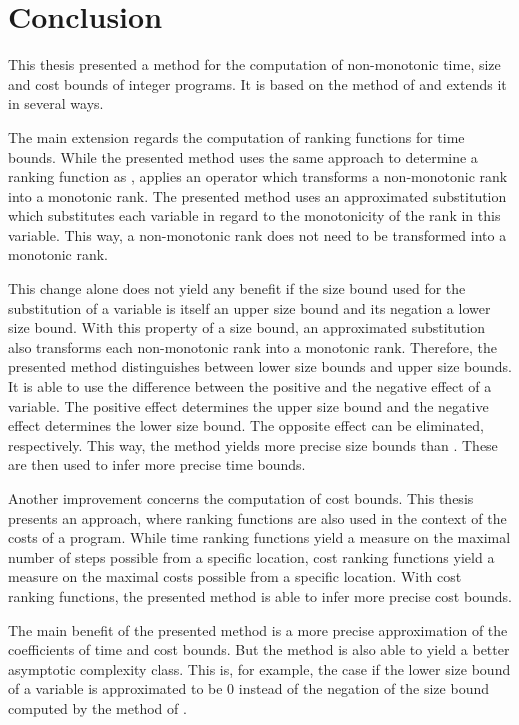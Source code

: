 \chapter{Conclusion}

This thesis presented a method for the computation of non-monotonic time, size and cost bounds of integer programs.
It is based on the method of \cite{koat} and extends it in several ways.

The main extension regards the computation of ranking functions for time bounds.
While the presented method uses the same approach to determine a ranking function as \cite{koat}, \cite{koat} applies an operator which transforms a non-monotonic rank into a monotonic rank.
The presented method uses an approximated substitution which substitutes each variable in regard to the monotonicity of the rank in this variable.
This way, a non-monotonic rank does not need to be transformed into a monotonic rank.

This change alone does not yield any benefit if the size bound used for the substitution of a variable is itself an upper size bound and its negation a lower size bound.
With this property of a size bound, an approximated substitution also transforms each non-monotonic rank into a monotonic rank.
Therefore, the presented method distinguishes between lower size bounds and upper size bounds.
It is able to use the difference between the positive and the negative effect of a variable.
The positive effect determines the upper size bound and the negative effect determines the lower size bound.
The opposite effect can be eliminated, respectively.
This way, the method yields more precise size bounds than \cite{koat}.
These are then used to infer more precise time bounds.

Another improvement concerns the computation of cost bounds.
This thesis presents an approach, where ranking functions are also used in the context of the costs of a program.
While time ranking functions yield a measure on the maximal number of steps possible from a specific location, cost ranking functions yield a measure on the maximal costs possible from a specific location.
With cost ranking functions, the presented method is able to infer more precise cost bounds.

The main benefit of the presented method is a more precise approximation of the coefficients of time and cost bounds.
But the method is also able to yield a better asymptotic complexity class.
This is, for example, the case if the lower size bound of a variable is approximated to be $0$ instead of the negation of the size bound computed by the method of \cite{koat}.

